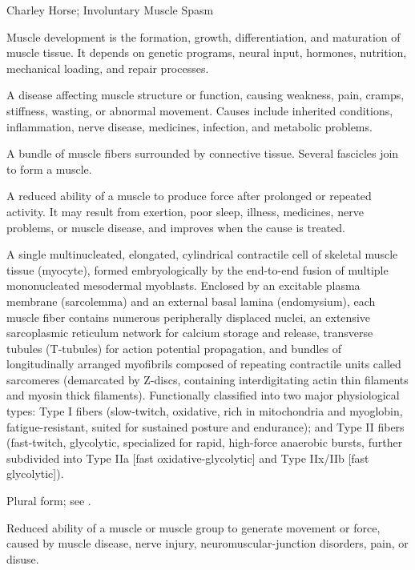 \synonyms
Charley Horse; Involuntary Muscle Spasm

 Muscle development is the formation, growth, differentiation, and maturation of muscle tissue. It depends on genetic programs, neural input, hormones, nutrition, mechanical loading, and repair processes.

 A disease affecting muscle structure or function, causing weakness, pain, cramps, stiffness, wasting, or abnormal movement. Causes include inherited conditions, inflammation, nerve disease, medicines, infection, and metabolic problems.

 A bundle of muscle fibers surrounded by connective tissue. Several fascicles join to form a muscle.

 A reduced ability of a muscle to produce force after prolonged or repeated activity. It may result from exertion, poor sleep, illness, medicines, nerve problems, or muscle disease, and improves when the cause is treated.

 A single multinucleated, elongated, cylindrical contractile cell of skeletal muscle tissue (myocyte), formed embryologically by the end-to-end fusion of multiple mononucleated mesodermal myoblasts. Enclosed by an excitable plasma membrane (sarcolemma) and an external basal lamina (endomysium), each muscle fiber contains numerous peripherally displaced nuclei, an extensive sarcoplasmic reticulum network for calcium storage and release, transverse tubules (T-tubules) for action potential propagation, and bundles of longitudinally arranged myofibrils composed of repeating contractile units called sarcomeres (demarcated by Z-discs, containing interdigitating actin thin filaments and myosin thick filaments). Functionally classified into two major physiological types: Type I fibers (slow-twitch, oxidative, rich in mitochondria and myoglobin, fatigue-resistant, suited for sustained posture and endurance); and Type II fibers (fast-twitch, glycolytic, specialized for rapid, high-force anaerobic bursts, further subdivided into Type IIa [fast oxidative-glycolytic] and Type IIx/IIb [fast glycolytic]).

 Plural form; see .

 Reduced ability of a muscle or muscle group to generate movement or force, caused by muscle disease, nerve injury, neuromuscular-junction disorders, pain, or disuse.

